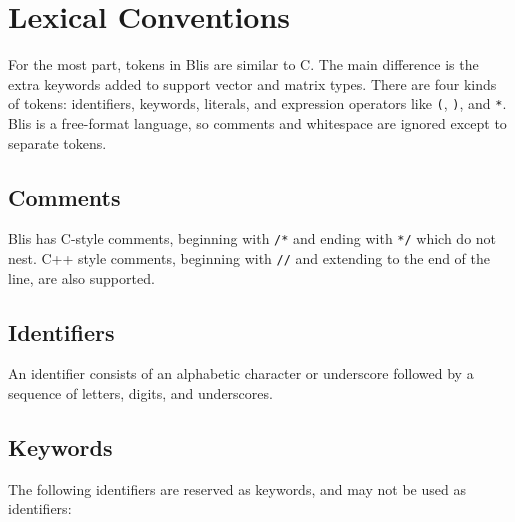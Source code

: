 \documentclass[11pt]{article}
\newcommand{\code}[1]{\texttt{#1}}
\begin{document}
\section{Lexical Conventions}

For the most part, tokens in Blis are similar to C. The main difference is the extra keywords added to support vector and matrix types. There are four kinds of tokens: identifiers, keywords, literals, and expression operators like \code{(}, \code{)}, and \code{*}. Blis is a free-format language, so comments and whitespace are ignored except to separate tokens.

\subsection{Comments}

Blis has C-style comments, beginning with \code{/*} and ending with \code{*/} which do not nest. C++ style comments, beginning with \code{//} and extending to the end of the line, are also supported.

\subsection{Identifiers}

An identifier consists of an alphabetic character or underscore followed by a sequence of letters, digits, and underscores.

\subsection{Keywords}

The following identifiers are reserved as keywords, and may not be used as identifiers:
\end{document}

